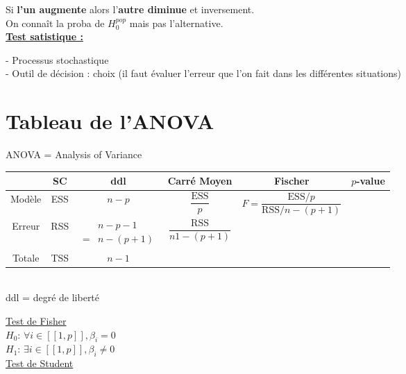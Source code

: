 \documentclass[12pt,a4paper]{article}
\begin{document}
	\vspace{.1cm}
	
	Si \textbf{l'un augmente} alors l'\textbf{autre diminue} et inversement.\\
	
	On connaît la proba de $H_0^{pop}$ mais pas l'alternative.\\
	
	\textbf{\underline{Test satistique :}} \begin{minipage}[t]{15cm}
		- Processus stochastique\\
		- Outil de décision : choix (il faut évaluer l'erreur que l'on fait dans les différentes situations)
	\end{minipage}
	
	
	\section{Tableau de l'ANOVA}
	
	ANOVA = Analysis of Variance
	
	\begin{NiceTabular}{c|c|c|c|c|c}
		\CodeBefore
		\Body
		& SC & ddl & Carré Moyen & Fischer & $p$-value\\
		\hline 
		Modèle & ESS & $n-p$ & $\dfrac{\mathrm{ESS}}p$ & $F=\dfrac{\mathrm{ESS}/p}{\mathrm{RSS}/n-(p+1)}$ & \\
		\hline
		Erreur & RSS & $\begin{aligned}
			&n-p-1 \\
			=&n-(p+1)
		\end{aligned}$ & $\dfrac{\mathrm{RSS}}{n1-(p+1)}$& & \\
		\hline
		\hline
		Totale & TSS & $n-1$ & & & 
	\end{NiceTabular}\\
	
	ddl = degré de liberté
	
	\vspace{1cm}
	
	\underline{Test de Fisher}\\
	
	$H_0$: $\forall i \in [\![1,p]\!], \beta_i = 0$\\
	$H_1$: $\exists i \in [\![1,p]\!], \beta_i\not= 0$\\
	\underline{Test de Student}
	
\end{document}
